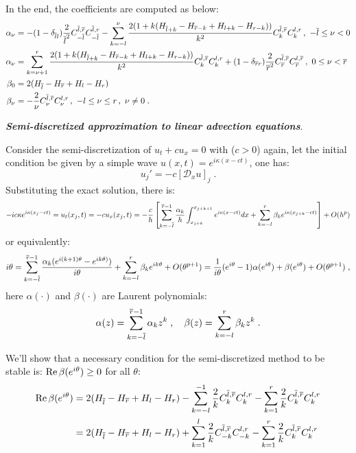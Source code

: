In the end, the coefficients are computed as below:
\begin{subequations}\label{eq:bg_hv_dx_coef}
  \begin{align}
    \label{eq:bg_hv_dx_coef_alpha_neg}
    \alpha_{\nu} &= -(1-\delta_{\bl l})\frac{2}{\bl^2}C^{\bl,\br}_{-\bl}C^{\bl,r}_{-\bl}-\sum_{k=-l}^{\nu}\frac{2(1+k(H_{\bl+k}-H_{\br-k}+H_{l+k}-H_{r-k}))}{k^2}C^{\bl,\br}_kC^{l,r}_k\,,\ -\bl\le\nu<0 \\
    \label{eq:bg_hv_dx_coef_alpha_pos}
    \alpha_{\nu} &= \sum_{k=\nu+1}^{r}\frac{2(1+k(H_{\bl+k}-H_{\br-k}+H_{l+k}-H_{r-k}))}{k^2}C^{\bl,\br}_kC^{l,r}_k+(1-\delta_{\br r})\frac{2}{\br^2}C^{\bl,\br}_{\br}C^{l,\br}_{\br}\,,\ 0\le\nu<\br \\
    \label{eq:bg_hv_dx_coef_beta_zero}
    \beta_0 &= 2(H_{\bl}-H_{\br}+H_l-H_r) \\
    \label{eq:bg_hv_dx_coef_beta_nzero}
    \beta_{\nu} &= -\frac{2}{\nu}C^{\bl,\br}_{\nu}C^{l,r}_{\nu}\,,\ -l\le\nu\le r\,,\ \nu\ne0\;.
  \end{align}
\end{subequations}

\medskip

\noindent
\textbf{\textit{Semi-discretized approximation to linear advection equations}}.

\smallskip
Consider the semi-discretization of $u_t+cu_x=0$ with ($c>0$) again, let the initial condition be given by a simple wave $u(x,t)=e^{i\kappa(x-ct)}$, one has:
\begin{displaymath}
  u_j' = -c[\mathcal{D}_xu]_j\;.
\end{displaymath}
Substituting the exact solution, there is:
\begin{displaymath}
  -ic\kappa e^{i\kappa(x_j-ct)} = u_t(x_j,t) = -cu_x(x_j,t) = -\frac{c}{h}\left[\sum_{k=-\overline{l}}^{\overline{r}-1}\frac{\alpha_k}{h}\int_{x_{j+k}}^{x_{j+k+1}}e^{i\kappa(x-ct)}dx+\sum_{k=-l}^r\beta_ke^{i\kappa(x_{j+k}-ct)}\right]+O(h^p)
\end{displaymath}
or equivalently:
\begin{equation}\label{eq:bg_hv_dx_adv_lte}
  i\theta = \sum_{k=-\overline{l}}^{\overline{r}-1}\frac{\alpha_k(e^{i(k+1)\theta}-e^{ik\theta)})}{i\theta}+\sum_{k=-l}^r\beta_ke^{ik\theta}+O(\theta^{p+1})
  = \frac{1}{i\theta}(e^{i\theta}-1)\alpha(e^{i\theta})+\beta(e^{i\theta})+O(\theta^{p+1})\;,
\end{equation}
here $\alpha(\cdot)$ and $\beta(\cdot)$ are Laurent polynomials:
\begin{equation}\label{eq:bg_hv_dx_adv_poly}
  \alpha(z)=\sum_{k=-\overline{l}}^{\overline{r}-1}\alpha_kz^k\;,\quad\beta(z)=\sum_{k=-l}^r\beta_kz^k\;.
\end{equation}

{\color{red}
  We'll show that a necessary condition for the semi-discretized method to be stable is: $\operatorname{Re}\beta(e^{i\theta})\ge0$ for all $\theta$:
  \begin{align*}
    \operatorname{Re}\beta(e^{i\theta}) &= 2(H_{\overline{l}}-H_{\overline{r}}+H_l-H_r)-\sum_{k=-l}^{-1}\frac{2}{k}C^{\overline{l},\overline{r}}_kC^{l,r}_k-\sum_{k=1}^r\frac{2}{k}C^{\overline{l},\overline{r}}_kC^{l,r}_k \\
    &= 2(H_{\overline{l}}-H_{\overline{r}}+H_l-H_r)+\sum_{k=1}^{l}\frac{2}{k}C^{\overline{l},\overline{r}}_{-k}C^{l,r}_{-k}-\sum_{k=1}^r\frac{2}{k}C^{\overline{l},\overline{r}}_kC^{l,r}_k
  \end{align*}
}
